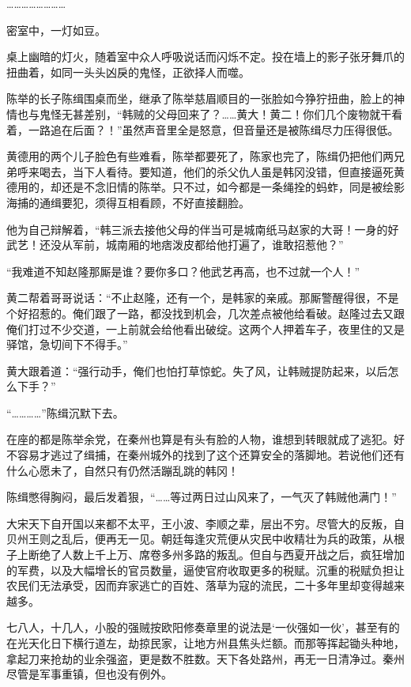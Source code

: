 ……………………

密室中，一灯如豆。

桌上幽暗的灯火，随着室中众人呼吸说话而闪烁不定。投在墙上的影子张牙舞爪的扭曲着，如同一头头凶戾的鬼怪，正欲择人而噬。

陈举的长子陈缉围桌而坐，继承了陈举慈眉顺目的一张脸如今狰狞扭曲，脸上的神情也与鬼怪无甚差别，“韩贼的父母回来了？……黄大！黄二！你们几个废物就干看着，一路追在后面？！”虽然声音里全是怒意，但音量还是被陈缉尽力压得很低。

黄德用的两个儿子脸色有些难看，陈举都要死了，陈家也完了，陈缉仍把他们两兄弟呼来喝去，当下人看待。要知道，他们的杀父仇人虽是韩冈没错，但直接逼死黄德用的，却还是不念旧情的陈举。只不过，如今都是一条绳拴的蚂蚱，同是被绘影海捕的通缉要犯，须得互相看顾，不好直接翻脸。

他为自己辩解着，“韩三派去接他父母的伴当可是城南纸马赵家的大哥！一身的好武艺！还没从军前，城南厢的地痞泼皮都给他打遍了，谁敢招惹他？”

“我难道不知赵隆那厮是谁？要你多口？他武艺再高，也不过就一个人！”

黄二帮着哥哥说话：“不止赵隆，还有一个，是韩家的亲戚。那厮警醒得很，不是个好招惹的。俺们跟了一路，都没找到机会，几次差点被他给看破。赵隆过去又跟俺们打过不少交道，一上前就会给他看出破绽。这两个人押着车子，夜里住的又是驿馆，急切间下不得手。”

黄大跟着道：“强行动手，俺们也怕打草惊蛇。失了风，让韩贼提防起来，以后怎么下手？”

“…………”陈缉沉默下去。

在座的都是陈举余党，在秦州也算是有头有脸的人物，谁想到转眼就成了逃犯。好不容易才逃过了缉捕，在秦州城外的找到了这个还算安全的落脚地。若说他们还有什么心愿未了，自然只有仍然活蹦乱跳的韩冈！

陈缉憋得胸闷，最后发着狠，“……等过两日过山风来了，一气灭了韩贼他满门！”

大宋天下自开国以来都不太平，王小波、李顺之辈，层出不穷。尽管大的反叛，自贝州王则之乱后，便再无一见。朝廷每逢灾荒便从灾民中收精壮为兵的政策，从根子上断绝了人数上千上万、席卷多州多路的叛乱。但自与西夏开战之后，疯狂增加的军费，以及大幅增长的官员数量，逼使官府收取更多的税赋。沉重的税赋负担让农民们无法承受，因而弃家逃亡的百姓、落草为寇的流民，二十多年里却变得越来越多。

七八人，十几人，小股的强贼按欧阳修奏章里的说法是‘一伙强如一伙’，甚至有的在光天化日下横行道左，劫掠民家，让地方州县焦头烂额。而那等挥起锄头种地，拿起刀来抢劫的业余强盗，更是数不胜数。天下各处路州，再无一日清净过。秦州尽管是军事重镇，但也没有例外。

